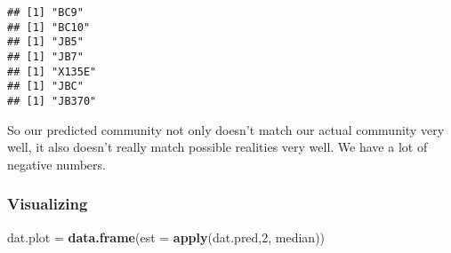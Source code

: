 \documentclass[
]{article}
\newenvironment{Shaded}{\begin{snugshade}}{\end{snugshade}}
\newcommand{\AttributeTok}[1]{\textcolor[rgb]{0.13,0.29,0.53}{#1}}
\newcommand{\DecValTok}[1]{\textcolor[rgb]{0.00,0.00,0.81}{#1}}
\newcommand{\FunctionTok}[1]{\textcolor[rgb]{0.13,0.29,0.53}{\textbf{#1}}}
\newcommand{\NormalTok}[1]{#1}
\newcommand{\OtherTok}[1]{\textcolor[rgb]{0.56,0.35,0.01}{#1}}
\newcommand{\SpecialCharTok}[1]{\textcolor[rgb]{0.81,0.36,0.00}{\textbf{#1}}}
\newcommand{\StringTok}[1]{\textcolor[rgb]{0.31,0.60,0.02}{#1}}
\begin{document}
\begin{verbatim}
## [1] "BC9"
## [1] "BC10"
## [1] "JB5"
## [1] "JB7"
## [1] "X135E"
## [1] "JBC"
## [1] "JB370"
\end{verbatim}

\begin{Shaded}
\end{Shaded}

So our predicted community not only doesn't match our actual community
very well, it also doesn't really match possible realities very well. We
have a lot of negative numbers.

\hypertarget{visualizing}{%
\subsubsection{Visualizing}\label{visualizing}}

\begin{Shaded}
\begin{Highlighting}[]
\NormalTok{dat.plot }\OtherTok{=} \FunctionTok{data.frame}\NormalTok{(}\AttributeTok{est =} \FunctionTok{apply}\NormalTok{(dat.pred,}\DecValTok{2}\NormalTok{, median))}
\end{Highlighting}
\end{Shaded}
\end{document}
